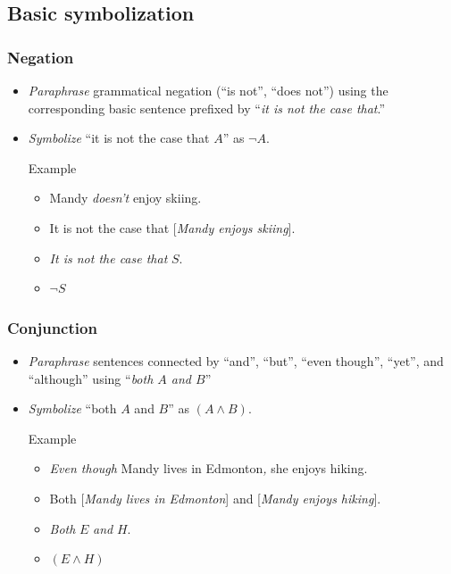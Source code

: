 \subsection{Basic symbolization}

\begin{frame}
  \frametitle{Negation}

  \begin{itemize}[<+->]
  \item \emph{Paraphrase} grammatical negation (``is not'', ``does not'') using the
  corresponding basic sentence prefixed by ``\emph{it is not the case that}.''

  \item \emph{Symbolize} ``it is not the case that $A$'' as
  \emph{$\lnot A$}.

  \begin{block}{Example}
    \begin{itemize}[<+->]
    \item[] Mandy \emph{doesn't} enjoy skiing.
    \item[] It is not the case that [\emph{Mandy enjoys skiing}].
    \item[] \emph{It is not the case that} $S$.
    \item[] $\lnot S$
    \end{itemize}
  \end{block}
  \end{itemize}
\end{frame}

\begin{frame}
  \frametitle{Conjunction}

  \begin{itemize}[<+->]
  \item \emph{Paraphrase} sentences connected by ``and'', ``but'', ``even
  though'', ``yet'', and ``although'' using
  ``\emph{both $A$ and $B$}''

  \item \emph{Symbolize} ``both $A$ and $B$'' as
  \emph{$(A \land B)$}.

  \begin{block}{Example}
  \begin{itemize}[<+->]
  \item[] \emph{Even though} Mandy lives in Edmonton\emph{,} she enjoys hiking.

  \item[] Both [\emph{Mandy lives in Edmonton}] and [\emph{Mandy enjoys hiking}].

  \item[] \emph{Both} $E$ \emph{and} $H$.

  \item[] $(E \land H)$
  \end{itemize} 
  \end{block}
\end{itemize}

\end{frame}

